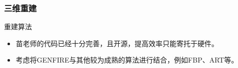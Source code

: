 \documentclass[12pt,aspectratio=169]{beamer} %
\begin{document}
    \begin{frame}
        \frametitle{三维重建} 
    \begin{block}{重建算法}
        \begin{itemize}
            \item 苗老师的代码已经十分完善，且开源，提高效率只能寄托于硬件。
            \item 考虑将GENFIRE与其他较为成熟的算法进行结合，例如FBP、ART等。
        \end{itemize}
    \end{block}
\end{frame}
\end{document}
